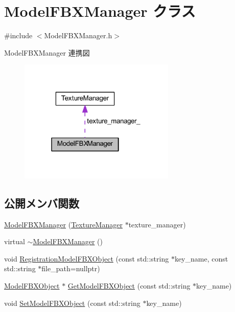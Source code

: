 \hypertarget{class_model_f_b_x_manager}{}\section{Model\+F\+B\+X\+Manager クラス}
\label{class_model_f_b_x_manager}


{\ttfamily \#include $<$Model\+F\+B\+X\+Manager.\+h$>$}



Model\+F\+B\+X\+Manager 連携図\nopagebreak
\begin{figure}[H]
\begin{center}
\leavevmode
\includegraphics[width=211pt]{class_model_f_b_x_manager__coll__graph}
\end{center}
\end{figure}
\subsection*{公開メンバ関数}
\begin{DoxyCompactItemize}
\item 
\mbox{\hyperlink{class_model_f_b_x_manager_a56089e9327a1739e3b88dada724bd898}{Model\+F\+B\+X\+Manager}} (\mbox{\hyperlink{class_texture_manager}{Texture\+Manager}} $\ast$texture\+\_\+manager)
\item 
virtual \mbox{\hyperlink{class_model_f_b_x_manager_a6714c69d45e3aad2d0d04b0d1a69d2dc}{$\sim$\+Model\+F\+B\+X\+Manager}} ()
\item 
void \mbox{\hyperlink{class_model_f_b_x_manager_a9a010cad6b7ddf07169daec28807b143}{Registration\+Model\+F\+B\+X\+Object}} (const std\+::string $\ast$key\+\_\+name, const std\+::string $\ast$file\+\_\+path=nullptr)
\item 
\mbox{\hyperlink{class_model_f_b_x_object}{Model\+F\+B\+X\+Object}} $\ast$ \mbox{\hyperlink{class_model_f_b_x_manager_abff9802a7edef85fd3b5de53d1d0b177}{Get\+Model\+F\+B\+X\+Object}} (const std\+::string $\ast$key\+\_\+name)
\item 
void \mbox{\hyperlink{class_model_f_b_x_manager_a1b25dfc755e529dc5f61913697ef99d1}{Set\+Model\+F\+B\+X\+Object}} (const std\+::string $\ast$key\+\_\+name)
\end{DoxyCompactItemize}
